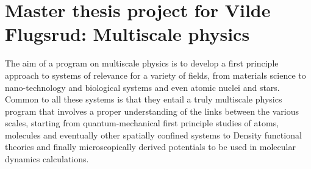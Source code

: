 \documentclass[10pt]{article}
\begin{document}
\section*{Master thesis project for Vilde Flugsrud: Multiscale physics}

The aim of a program on multiscale physics is to develop a first
principle approach to systems of relevance for a variety of fields,
from materials science to nano-technology and biological systems and
even atomic nuclei and stars.  Common to all these systems is that
they entail a truly multiscale physics program that involves a proper
understanding of the links between the various scales, starting from
quantum-mechanical first principle studies of atoms, molecules and
eventually other spatially confined systems to Density functional
theories and finally microscopically derived potentials to be used in
molecular dynamics calculations.
\end{document}
